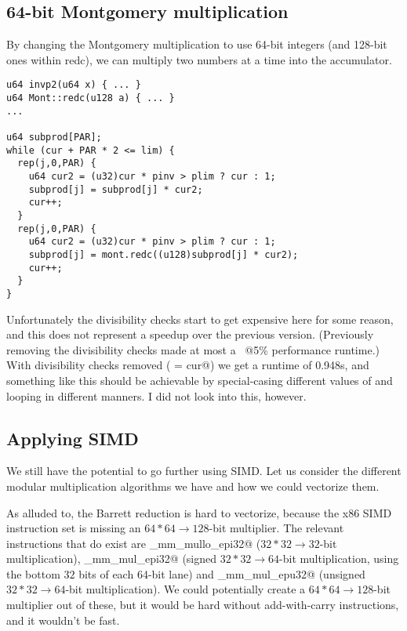 \subsection{64-bit Montgomery multiplication}

By changing the Montgomery multiplication to use 64-bit integers (and 128-bit ones within redc),
we can multiply two numbers at a time into the accumulator.

\begin{lstlisting}
u64 invp2(u64 x) { ... }
u64 Mont::redc(u128 a) { ... }
...

u64 subprod[PAR];
while (cur + PAR * 2 <= lim) {
  rep(j,0,PAR) {
    u64 cur2 = (u32)cur * pinv > plim ? cur : 1;
    subprod[j] = subprod[j] * cur2;
    cur++;
  }
  rep(j,0,PAR) {
    u64 cur2 = (u32)cur * pinv > plim ? cur : 1;
    subprod[j] = mont.redc((u128)subprod[j] * cur2);
    cur++;
  }
}
\end{lstlisting}

Unfortunately the divisibility checks start to get expensive here for some reason, and this does not represent a speedup over the previous version.
(Previously removing the divisibility checks made at most a \verb@~@5\% performance runtime.)
With divisibility checks removed ( = cur@) we get a runtime of 0.948s, and something like this should be achievable
by special-casing different values of \verb@p@ and looping in different manners.
I did not look into this, however.

\subsection{Applying SIMD}

We still have the potential to go further using SIMD.
Let us consider the different modular multiplication algorithms we have and how we could vectorize them.

As alluded to, the Barrett reduction is hard to vectorize, because the x86 SIMD instruction set is missing an \mbox{$64*64\rightarrow128$}-bit multiplier.
The relevant instructions that do exist are \verb@_mm_mullo_epi32@ (\mbox{$32*32\rightarrow32$}-bit multiplication), \verb@_mm_mul_epi32@ (signed \mbox{$32*32\rightarrow64$}-bit multiplication, using the bottom $32$ bits of each 64-bit lane) and \verb@_mm_mul_epu32@ (unsigned \mbox{$32*32\rightarrow64$}-bit multiplication).
We could potentially create a \mbox{$64*64\rightarrow128$}-bit multiplier out of these, but it would be hard without add-with-carry instructions, and it wouldn't be fast.


